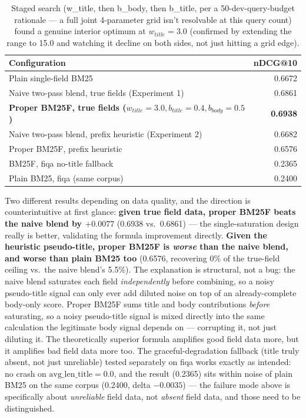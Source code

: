 \documentclass[11pt]{article}
\begin{document}
\begin{table}[h]
\centering
\begin{tabular}{lr}
\toprule
Configuration & nDCG@10 \\
\midrule
Plain single-field BM25 & 0.6672 \\
Naive two-pass blend, true fields (Experiment 1) & 0.6861 \\
\textbf{Proper BM25F, true fields (}$w_{title}{=}3.0,b_{title}{=}0.4,b_{body}{=}0.5$\textbf{)} & \textbf{0.6938} \\
Naive two-pass blend, prefix heuristic (Experiment 2) & 0.6682 \\
Proper BM25F, prefix heuristic & 0.6576 \\
BM25F, fiqa no-title fallback & 0.2365 \\
Plain BM25, fiqa (same corpus) & 0.2400 \\
\bottomrule
\end{tabular}
\caption{Staged search (w\_title, then b\_body, then b\_title, per a
50-dev-query-budget rationale --- a full joint 4-parameter grid isn't
resolvable at this query count) found a genuine interior optimum at
$w_{title}{=}3.0$ (confirmed by extending the range to 15.0 and watching
it decline on both sides, not just hitting a grid edge).}
\end{table}

\noindent Two different results depending on data quality, and the
direction is counterintuitive at first glance: \textbf{given true field
data, proper BM25F beats the naive blend by $+0.0077$} (0.6938 vs.\
0.6861) --- the single-saturation design really is better, validating
the formula improvement directly. \textbf{Given the heuristic
pseudo-title, proper BM25F is \emph{worse} than the naive blend, and
worse than plain BM25 too} (0.6576, recovering 0\% of the true-field
ceiling vs.\ the naive blend's 5.5\%). The explanation is structural,
not a bug: the naive blend saturates each field \emph{independently}
before combining, so a noisy pseudo-title signal can only ever add
diluted noise on top of an already-complete body-only score. Proper
BM25F sums title and body contributions \emph{before} saturating, so a
noisy pseudo-title signal is mixed directly into the same calculation
the legitimate body signal depends on --- corrupting it, not just
diluting it. The theoretically superior formula amplifies good field
data more, but it amplifies bad field data more too. The
graceful-degradation fallback (title truly absent, not just unreliable)
tested separately on fiqa works exactly as intended: no crash on
$\text{avg\_len\_title}{=}0.0$, and the result (0.2365) sits within
noise of plain BM25 on the same corpus (0.2400, delta $-0.0035$) ---
the failure mode above is specifically about \emph{unreliable} field
data, not \emph{absent} field data, and those need to be distinguished.
\end{document}
